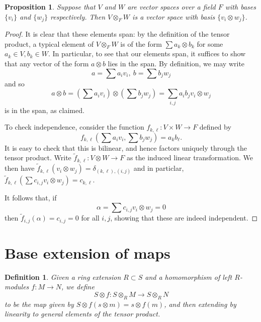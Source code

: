 \documentclass[12pt]{report}
\theoremstyle{plain}
\newtheorem{defn}[thm]{Definition}
\newtheorem{prop}[thm]{Proposition}
\newcommand{\til}{\widetilde}
\begin{document}
\begin{prop} \label{tensor basis}
Suppose that $V$ and $W$ are vector spaces over a field $F$ with bases
$\{v_i\}$ and $\{w_j\}$ respectively. Then $V \otimes_F W$ is a vector
space with basis $\{v_i \otimes w_j\}$.
\end{prop}
\begin{proof}
It is clear that these elements span: by the definition of the tensor
product, a typical element of $V \otimes_F W$ is of the form $\sum a_k
\otimes b_k$ for some $a_k \in V, b_k \in W$. In particular, to see that
our elements span, it suffices to show that any vector of the form $a
\otimes b$ lies in the span. By definition, we may write
\[ a = \sum a_i v_i, \ b = \sum b_j w_j \]
and so
\[ a \otimes b = (\sum a_i v_i) \otimes (\sum b_j w_j) = \sum_{i,j} a_i b_j
v_i \otimes w_j \]
is in the span, as claimed.

To check independence, consider the function $f_{k,\ell} : V \times W \to F$
defined by
\[ f_{k, \ell} (\sum a_i v_i, \sum b_j w_j) = a_k b_\ell.\]
It is easy to check that this is bilinear, and hence factors uniquely
through the tensor product. Write $\til f_{k, \ell} : V \otimes W \to F$ as
the induced linear transformation. We then have 
$\til f_{k, \ell} (v_i \otimes w_j) = \delta_{(k, \ell), (i, j)}$ 
and in particlar, 
$\til f_{k, \ell}(\sum c_{i,j} v_i \otimes w_j) = c_{k, \ell}$.

It follows that, if 
\[\alpha = \sum c_{i, j} v_i \otimes w_j = 0\]
then $\til f_{i, j}(\alpha) = c_{i, j} = 0$ for all $i, j$, showing that
these are indeed independent.
\end{proof}

\section{Base extension of maps}

\begin{defn}
Given a ring extension $R \subset S$ and a homomorphism of left $R$-modules
$f : M \to N$, we define 
\[S \otimes f : S \otimes_R M \to S \otimes_R N\]
to be the map given by $S \otimes f (s \otimes m) = s \otimes f(m)$, and
then extending by linearity to general elements of the tensor product.
\end{defn}
\end{document}
